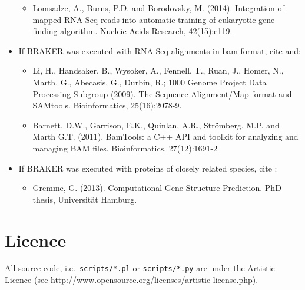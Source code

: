 \documentclass[]{article}
\providecommand{\tightlist}{%
  \setlength{\itemsep}{0pt}\setlength{\parskip}{0pt}}
\begin{document}
\begin{itemize}
  \begin{itemize}
  \tightlist
  \item
    Lomsadze, A., Burns, P.D. and Borodovsky, M. (2014). Integration of
    mapped RNA-Seq reads into automatic training of eukaryotic gene
    finding algorithm. Nucleic Acids Research, 42(15):e119.
  \end{itemize}
\item
  If BRAKER was executed with RNA-Seq alignments in bam-format, cite
  and:

  \begin{itemize}
  \item
    Li, H., Handsaker, B., Wysoker, A., Fennell, T., Ruan, J., Homer,
    N., Marth, G., Abecasis, G., Durbin, R.; 1000 Genome Project Data
    Processing Subgroup (2009). The Sequence Alignment/Map format and
    SAMtools. Bioinformatics, 25(16):2078-9.
  \item
    Barnett, D.W., Garrison, E.K., Quinlan, A.R., Strömberg, M.P. and
    Marth G.T. (2011). BamTools: a C++ API and toolkit for analyzing and
    managing BAM files. Bioinformatics, 27(12):1691-2
  \end{itemize}
\item
  If BRAKER was executed with proteins of closely related species, cite
  :

  \begin{itemize}
  \tightlist
  \item
    Gremme, G. (2013). Computational Gene Structure Prediction. PhD
    thesis, Universität Hamburg.
  \end{itemize}
\end{itemize}

\hypertarget{licence}{\section{Licence}\label{licence}}

All source code, i.e.~\texttt{scripts/*.pl} or \texttt{scripts/*.py} are
under the Artistic Licence (see
\url{http://www.opensource.org/licenses/artistic-license.php}).



\end{document}
